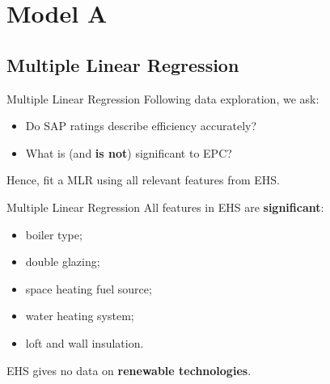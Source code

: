 \section{Model A}

\subsection{Multiple Linear Regression}

\begin{frame}{Multiple Linear Regression}
    Following data exploration, we ask:

    \vspace{1.0 em}

    \begin{itemize}
        \setlength\itemsep{16.0pt}
        \item Do SAP ratings describe efficiency accurately?
        \item What is (and \textbf{is not}) significant to EPC?
    \end{itemize}

    \vspace{1.0 em}

    Hence, fit a MLR using all relevant features from EHS.
\end{frame}

\begin{frame}{Multiple Linear Regression}
    All features in EHS are \textbf{significant}:

    \begin{itemize}
        \item boiler type;
        \item double glazing;
        \item space heating fuel source;
        \item water heating system;
        \item loft and wall insulation.
    \end{itemize}

    \vspace{0.5 em}

    EHS gives no data on \textbf{renewable technologies}.
\end{frame}